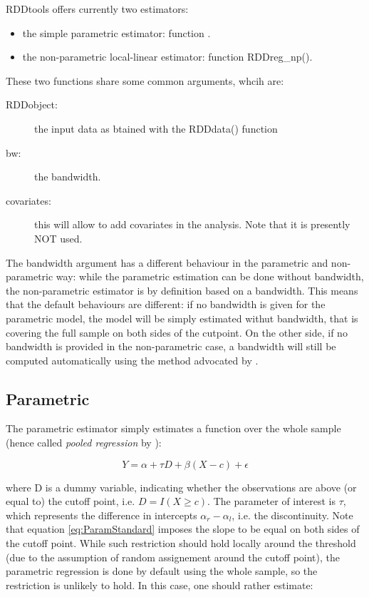 \documentclass[english,nojss]{jss}\usepackage{graphicx, color}
\begin{document}

RDDtools offers currently two estimators:
\begin{itemize}
\item the simple parametric estimator: function . 
\item the non-parametric local-linear estimator: function RDDreg\_np(). 
\end{itemize}
These two functions share some common arguments, whcih are:
\begin{description}
\item [{RDDobject:}] the input data as btained with the RDDdata() function
\item [{bw:}] the bandwidth. 
\item [{covariates:}] this will allow to add covariates in the analysis.
Note that it is presently NOT used. 
\end{description}
The bandwidth argument has a different behaviour in the parametric
and non-parametric way: while the parametric estimation can be done
without bandwidth, the non-parametric estimator is by definition based
on a bandwidth. This means that the default behaviours are different:
if no bandwidth is given for the parametric model, the model will
be simply estimated withut bandwidth, that is covering the full sample
on both sides of the cutpoint. On the other side, if no bandwidth
is provided in the non-parametric case, a bandwidth will still be
computed automatically using the method advocated by \citet{ImbensKalyanaraman2012}. 


\subsection{Parametric}

The parametric estimator simply estimates a function over the whole
sample (hence called \emph{pooled regression} by \citealp{LeeLemieux2010}):

\begin{equation}
Y=\alpha+\tau D+\beta(X-c)+\epsilon\label{eq:ParamStandard}
\end{equation}


where D is a dummy variable, indicating whether the observations are
above (or equal to) the cutoff point, i.e. $D=I(X\geq c)$. The parameter
of interest is $\tau$, which represents the difference in intercepts
$\alpha_{r}-\alpha_{l}$, i.e. the discontinuity. Note that equation
\ref{eq:ParamStandard} imposes the slope to be equal on both sides
of the cutoff point. While such restriction should hold locally around
the threshold (due to the assumption of random assignement around
the cutoff point), the parametric regression is done by default using
the whole sample, so the restriction is unlikely to hold. In this
case, one should rather estimate:
\end{document}
